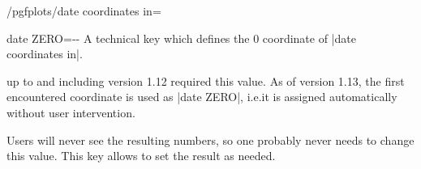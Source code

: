 {\begin{stylekey}{/pgfplots/date coordinates in=}
\begin{codeexample}[]
\end{codeexample}
\end{stylekey}

\begin{pgfplotskey}{date ZERO=--}
    A technical key which defines the $0$ coordinate of |date coordinates in|.

    \PGFPlots{} up to and including version 1.12 required this value. As of
    version 1.13, the first encountered coordinate is used as |date ZERO|,
    i.e.\@ it is assigned automatically without user intervention.

    Users will never see the resulting numbers, so one probably never needs to
    change this value. This key allows to set the result as needed.
\end{pgfplotskey}

}
